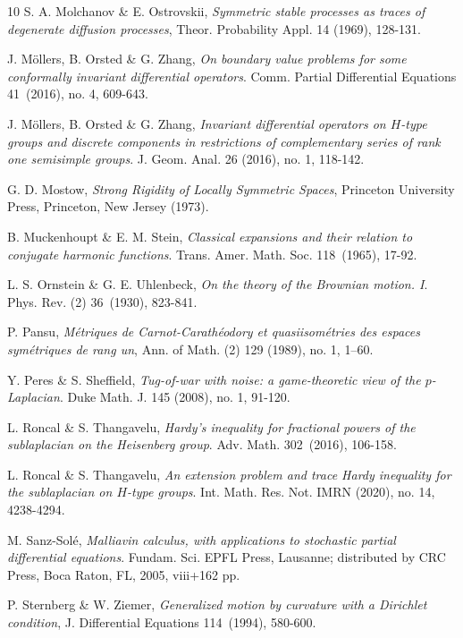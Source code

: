 \documentclass[11pt,a4paper]{amsart}
\numberwithin{equation}{section}
\numberwithin{equation}{section}
\begin{document}
\begin{thebibliography}{10}
S. A. Molchanov \& E. Ostrovskii, \emph{Symmetric stable processes as traces of degenerate diffusion processes}, Theor. Probability Appl. 14 (1969), 128-131.


J. M\"ollers, B. Orsted \& G. Zhang, \emph{On boundary value problems for some conformally invariant differential operators}. Comm. Partial Differential Equations 41~(2016), no. 4, 609-643.

J. M\"ollers, B. Orsted \& G. Zhang, \emph{Invariant differential operators on $H$-type groups and discrete components in restrictions of complementary series of rank one semisimple groups}.
J. Geom. Anal. 26 (2016), no. 1, 118-142.

G. D. Mostow, {\em Strong Rigidity of Locally Symmetric Spaces},
Princeton University Press, Princeton, New Jersey (1973).

B. Muckenhoupt \& E. M. Stein, \emph{Classical expansions and their relation to conjugate harmonic functions}. 
Trans. Amer. Math. Soc. 118~(1965), 17-92. 

L. S. Ornstein \& G. E. Uhlenbeck, \emph{On the theory of the Brownian motion. I}.
Phys. Rev. (2) 36~(1930), 823-841. 

P. Pansu, \emph{M\'etriques de Carnot-Carath\'eodory et
quasiisom\'etries des espaces sym\'etriques de rang un}, Ann. of Math. (2)
129 (1989), no. 1, 1--60.

Y. Peres \& S. Sheffield, \emph{Tug-of-war with noise: a game-theoretic view of the $p$-Laplacian}.
Duke Math. J. 145 (2008), no. 1, 91-120.

L. Roncal \& S. Thangavelu, \emph{Hardy's inequality for fractional powers of the sublaplacian on the Heisenberg group}. Adv. Math. 302~(2016), 106-158.

L. Roncal \& S. Thangavelu, \emph{An extension problem and trace Hardy inequality for the sublaplacian on $H$-type groups}. Int. Math. Res. Not. IMRN (2020), no. 14, 4238-4294.

M. Sanz-Sol\'e, \emph{Malliavin calculus, with applications to stochastic partial differential equations}.
Fundam. Sci.
EPFL Press, Lausanne; distributed by CRC Press, Boca Raton, FL, 2005, viii+162 pp.


P.  Sternberg \& W. Ziemer, \emph{Generalized motion  by curvature with a  Dirichlet  condition}, J. Differential Equations 114~(1994), 580-600.


\end{thebibliography}
\end{document}
